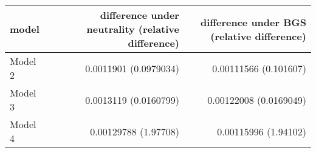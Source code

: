 
    \begin{tabular}{l r r}
\hline
model & difference under neutrality (relative difference) & difference under BGS (relative difference)\\
\hline
Model 2 & 0.0011901 (0.0979034) & 0.00111566 (0.101607)\\
Model 3 & 0.0013119 (0.0160799) & 0.00122008 (0.0169049)\\
Model 4 & 0.00129788 (1.97708) & 0.00115996 (1.94102)\\
\hline
    \end{tabular}
